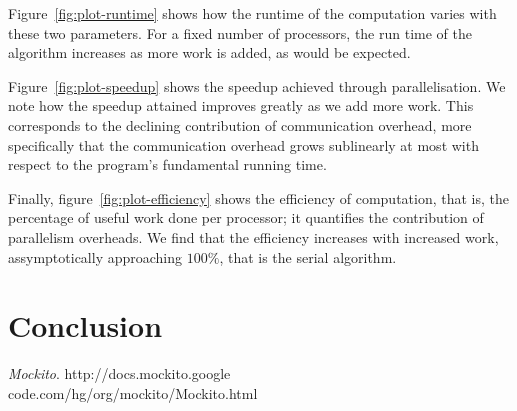 \documentclass[11pt,twocolumn]{article} %
\begin{document}
Figure~\ref{fig:plot-runtime} shows how the runtime of the computation varies with these two parameters. For a fixed number of processors, the run time of the algorithm increases as more work is added, as would be expected.

Figure~\ref{fig:plot-speedup} shows the speedup achieved through parallelisation. We note how the speedup attained improves greatly as we add more work. This corresponds to the declining contribution of communication overhead, more specifically that the communication overhead grows sublinearly at most with respect to the program's fundamental running time.

Finally, figure~\ref{fig:plot-efficiency} shows the efficiency of computation, that is, the percentage of useful work done per processor; it quantifies the contribution of parallelism overheads. We find that the efficiency increases with increased work, assymptotically approaching $100\%$, that is the serial algorithm.



\section{Conclusion}



\begin{thebibliography}{9}
  \emph{Mockito}.
  http://docs.mockito.google\\code.com/hg/org/mockito/Mockito.html  


  
\end{thebibliography}
\end{document}
